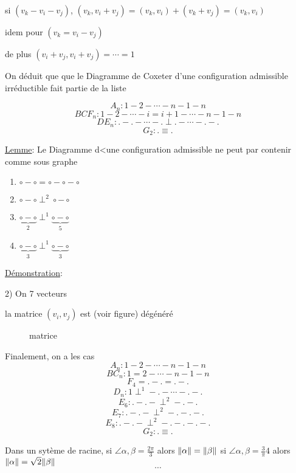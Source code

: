 si \((v_k - v_i - v_j )\), \( (v_k, v_i + v_j ) = (v_k , v_i ) + (v_k + v_j ) = (v_k , v_i ) \)

idem pour \( \left( v_k = v_i -v_j  \right)\)

de plus \(\left(  v_i + v_j , v_i + v_j \right) = \dotsb = 1\)

On déduit que que le Diagramme de Coxeter d'une configuration admissible irréductible fait partie de la liste 

\[ A_n :1 - 2 -  \dotsb - n-1 - n\]
\[ BCF_n  :1 - 2 -  \dotsb - i = i+1 - \dotsb- n-1 - n\]
\[ DE_n  :. - . -  \dotsb - . \perp . - \dotsb-. - .\]
\[ G_2: . \equiv . \]

\underline{Lemme}: Le Diagramme d<une configuration admissible ne peut par contenir comme sous graphe 

\begin{enumerate}
	\item \( \circ  - \circ = \circ - \circ -\circ\)
	\item \( \circ  - \circ \perp^{2} \circ - \circ \)
	\item \( \underbrace{\circ  - \circ}_{2}  \perp^{1} \underbrace{\circ - \circ}_{5}  \)
	\item \( \underbrace{\circ  - \circ}_{3}  \perp^{1} \underbrace{\circ - \circ}_{3}  \)
\end{enumerate}

\underline{Démonstration}: 

2) On 7 vecteurs 

la matrice \((v_i ,v_j ) \) est (voir figure) dégénéré


\begin{figure}[ht]
    \centering
    \caption{matrice}
    \label{fig:matrice}
\end{figure}

Finalement, on a les cas
\[ A_n :1 - 2 -  \dotsb - n-1 - n\]
\[ BC_n  : 1 = 2 - \dotsb- n-1 - n\]
\[ F_4 = . - . = . - . \]
\[ D_n  : 1 \perp^{1}- . - \dotsb- . - .\]
\[ E_6 : . - . -\perp^{2} -. - . \]
\[ E_7 : . - . -\perp^{2} -. - . -. \]
\[ E_8 : . - . -\perp^{2} -. - . -. -. \]
\[ G_2: . \equiv . \]



\begin{tcolorbox}[title=Rappel]
	Dans un sytème de racine, si \(\angle \alpha, \beta = \frac{2\pi}{3} \) alors \(\norm{\alpha}  = \norm{\beta} \) 
	si \(\angle \alpha, \beta = \frac{3}{\pi} 4 \) alors \(\norm{\alpha} = \sqrt{2} \norm{\beta}  \)
	\[ \dotsb \]
\end{tcolorbox}

